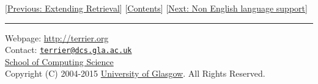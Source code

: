 {[}\href{extend_retrieval.html}{Previous: Extending Retrieval}{]}
{[}\href{index.html}{Contents}{]} {[}\href{languages.html}{Next: Non
English language support}{]}

\begin{center}\rule{0.5\linewidth}{\linethickness}\end{center}

Webpage: \url{http://terrier.org}\\
Contact:
\href{mailto:terrier@dcs.gla.ac.uk}{\nolinkurl{terrier@dcs.gla.ac.uk}}\\
\href{http://www.dcs.gla.ac.uk/}{School of Computing Science}\\
Copyright (C) 2004-2015 \href{http://www.gla.ac.uk/}{University of
Glasgow}. All Rights Reserved.

~
